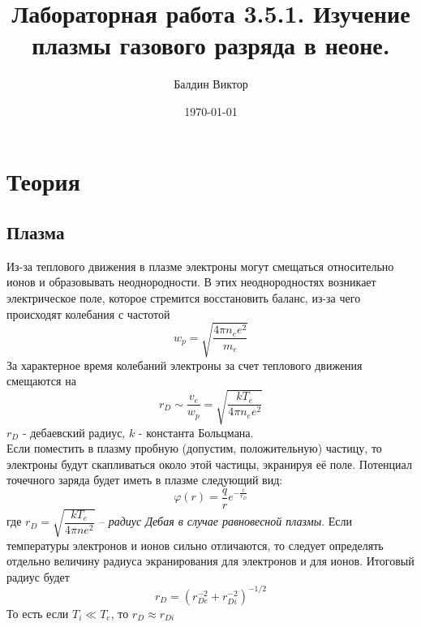 \documentclass[a4paper, 10pt]{article}
\title{Лабораторная работа 3.5.1. Изучение плазмы газового разряда в неоне.}
\author{Балдин Виктор}
\date{\today}
\begin{document}
        \maketitle
        \section*{Теория}
        \subsection*{Плазма}

        Из-за теплового движения в плазме электроны могут смещаться относительно ионов и образовывать неоднородности. В этих неоднородностях возникает электрическое поле, которое стремится восстановить баланс, из-за чего происходят колебания с частотой
        \[w_p = \sqrt{\frac{4\pi n_e e^2}{m_e}}\]
        За характерное время колебаний электроны за счет теплового движения смещаются на
        \[r_D \sim \frac{v_e}{w_p} = \sqrt{\frac{kT_e}{4\pi n_e e^2}}\]
        $r_D$ - дебаевский радиус, $k$ - константа Больцмана.\\
        Если поместить в плазму пробную (допустим, положительную) частицу, то электроны будут скапливаться около этой частицы, экранируя её поле. Потенциал точечного заряда будет иметь в плазме следующий вид:
        \[\varphi(r) = \frac{q}{r}e^{-\frac{r}{r_D}}\]
        где $r_D = \sqrt{\dfrac{kT_e}{4\pi n e^2}}$ -- \textit{радиус Дебая в случае равновесной плазмы}. Если температуры электронов и ионов сильно отличаются, то следует определять отдельно величину радиуса экранирования для электронов и для ионов. Итоговый радиус будет
        \[r_D = (r_{De}^{-2} + r_{Di}^{-2})^{-1/2}\]
        То есть если $T_i \ll T_e$, то $r_D \approx r_{Di}$
\end{document}
